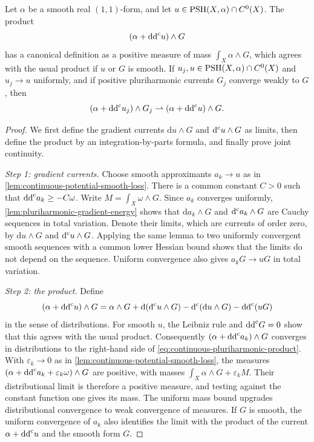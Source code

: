 \begin{theorem}\label{thm:continuous-pluriharmonic-trace-product}
Let $\alpha$ be a smooth real $(1,1)$-form, and let $u\in\mathrm{PSH}(X,\alpha)\cap C^0(X)$. The product
\[
 (\alpha+\mathrm{dd}^{\mathrm{c}} u)\wedge G
\]
has a canonical definition as a positive measure of mass $\int_X\alpha\wedge G$, which agrees with the usual product if $u$ or $G$ is smooth. If $u_j,u\in\mathrm{PSH}(X,\alpha)\cap C^0(X)$ and $u_j\to u$ uniformly, and if positive pluriharmonic currents $G_j$ converge weakly to $G$, then
\[
 (\alpha+\mathrm{dd}^{\mathrm{c}} u_j)\wedge G_j
 \rightharpoonup(\alpha+\mathrm{dd}^{\mathrm{c}} u)\wedge G.
\]
\end{theorem}
\begin{proof}
We first define the gradient currents $\mathrm{d}u\wedge G$ and $\mathrm d^{\mathrm c} u\wedge G$ as limits, then define the product by an integration-by-parts formula, and finally prove joint continuity.

\medskip\noindent\emph{Step 1: gradient currents.} Choose smooth approximants $a_k\to u$ as in \cref{lem:continuous-potential-smooth-loss}. There is a common constant $C>0$ such that $\mathrm{dd}^{\mathrm{c}} a_k\geq-C\omega$. Write $M=\int_X\omega\wedge G$. Since $a_k$ converges uniformly, \cref{lem:pluriharmonic-gradient-energy} shows that $\mathrm{d}a_k\wedge G$ and $\mathrm d^{\mathrm c} a_k\wedge G$ are Cauchy sequences in total variation. Denote their limits, which are currents of order zero, by $\mathrm{d}u\wedge G$ and $\mathrm d^{\mathrm c} u\wedge G$. Applying the same lemma to two uniformly convergent smooth sequences with a common lower Hessian bound shows that the limits do not depend on the sequence. Uniform convergence also gives $a_kG\to uG$ in total variation.

\medskip\noindent\emph{Step 2: the product.} Define
\begin{equation}\label{eq:continuous-pluriharmonic-product}
 (\alpha+\mathrm{dd}^{\mathrm{c}} u)\wedge G
 =\alpha\wedge G+\mathrm{d}(\mathrm d^{\mathrm c} u\wedge G)
   -\mathrm d^{\mathrm c}(\mathrm{d}u\wedge G)-\mathrm{dd}^{\mathrm{c}}(uG)
\end{equation}
in the sense of distributions. For smooth $u$, the Leibniz rule and $\mathrm{dd}^{\mathrm{c}} G=0$ show that this agrees with the usual product. Consequently $(\alpha+\mathrm{dd}^{\mathrm{c}} a_k)\wedge G$ converges in distributions to the right-hand side of \eqref{eq:continuous-pluriharmonic-product}. With $\varepsilon_k\to0$ as in \cref{lem:continuous-potential-smooth-loss}, the measures $(\alpha+\mathrm{dd}^{\mathrm{c}} a_k+\varepsilon_k\omega)\wedge G$ are positive, with masses $\int_X\alpha\wedge G+\varepsilon_kM$. Their distributional limit is therefore a positive measure, and testing against the constant function one gives its mass. The uniform mass bound upgrades distributional convergence to weak convergence of measures. If $G$ is smooth, the uniform convergence of $a_k$ also identifies the limit with the product of the current $\alpha+\mathrm{dd}^{\mathrm{c}} u$ and the smooth form $G$.


\end{proof}
